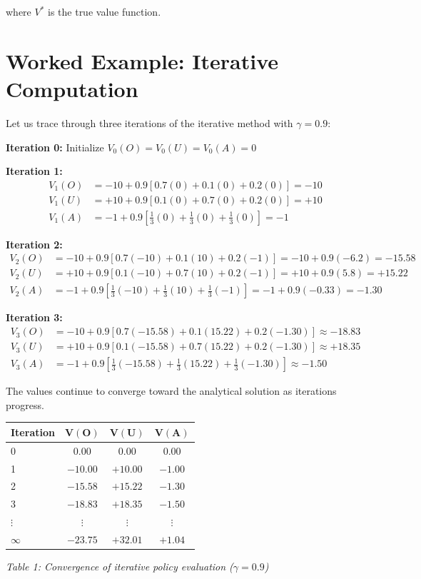 \documentclass[11pt]{article}
\theoremstyle{definition}
\begin{document}
where $V^*$ is the true value function.

\section{Worked Example: Iterative Computation}

Let us trace through three iterations of the iterative method with $\gamma = 0.9$:

\textbf{Iteration 0:} Initialize $V_0(O) = V_0(U) = V_0(A) = 0$

\textbf{Iteration 1:}
\begin{align*}
V_1(O) &= -10 + 0.9[0.7(0) + 0.1(0) + 0.2(0)] = -10 \\
V_1(U) &= +10 + 0.9[0.1(0) + 0.7(0) + 0.2(0)] = +10 \\
V_1(A) &= -1 + 0.9[\tfrac{1}{3}(0) + \tfrac{1}{3}(0) + \tfrac{1}{3}(0)] = -1
\end{align*}

\textbf{Iteration 2:}
\begin{align*}
V_2(O) &= -10 + 0.9[0.7(-10) + 0.1(10) + 0.2(-1)] = -10 + 0.9(-6.2) = -15.58 \\
V_2(U) &= +10 + 0.9[0.1(-10) + 0.7(10) + 0.2(-1)] = +10 + 0.9(5.8) = +15.22 \\
V_2(A) &= -1 + 0.9[\tfrac{1}{3}(-10) + \tfrac{1}{3}(10) + \tfrac{1}{3}(-1)] = -1 + 0.9(-0.33) = -1.30
\end{align*}

\textbf{Iteration 3:}
\begin{align*}
V_3(O) &= -10 + 0.9[0.7(-15.58) + 0.1(15.22) + 0.2(-1.30)] \approx -18.83 \\
V_3(U) &= +10 + 0.9[0.1(-15.58) + 0.7(15.22) + 0.2(-1.30)] \approx +18.35 \\
V_3(A) &= -1 + 0.9[\tfrac{1}{3}(-15.58) + \tfrac{1}{3}(15.22) + \tfrac{1}{3}(-1.30)] \approx -1.50
\end{align*}

The values continue to converge toward the analytical solution as iterations progress.

\begin{center}
\begin{tabular}{lccc}
\hline
\textbf{Iteration} & $\mathbf{V(O)}$ & $\mathbf{V(U)}$ & $\mathbf{V(A)}$ \\
\hline
0 & 0.00 & 0.00 & 0.00 \\
1 & $-10.00$ & $+10.00$ & $-1.00$ \\
2 & $-15.58$ & $+15.22$ & $-1.30$ \\
3 & $-18.83$ & $+18.35$ & $-1.50$ \\
$\vdots$ & $\vdots$ & $\vdots$ & $\vdots$ \\
$\infty$ & $-23.75$ & $+32.01$ & $+1.04$ \\
\hline
\end{tabular}
\end{center}
\begin{center}
\textit{Table 1: Convergence of iterative policy evaluation ($\gamma = 0.9$)}
\end{center}
\end{document}
